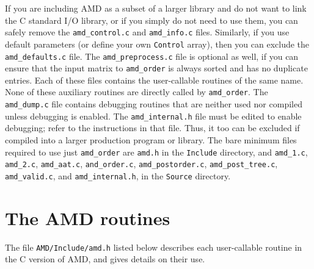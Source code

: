 \documentclass[11pt]{article}
\begin{document}
If you are including AMD as a subset of a larger library and do not want
to link the C standard I/O library, or if you simply do not need to use
them, you can safely remove the {\tt amd\_control.c} and {\tt amd\_info.c}
files.  Similarly, if you use default parameters (or define your
own {\tt Control} array), then you can exclude the {\tt amd\_defaults.c}
file.  The {\tt amd\_preprocess.c} file is optional as well, if you
can ensure that the input matrix to {\tt amd\_order} is always sorted
and has no duplicate entries.
Each of these files contains the user-callable routines of the same
name.  None of these auxiliary routines are directly called by
{\tt amd\_order}.
The {\tt amd\_dump.c} file contains debugging routines
that are neither used nor compiled unless debugging is enabled.
The {\tt amd\_internal.h} file must be edited to enable debugging;
refer to the instructions in that file.  Thus, it too can be excluded
if compiled into a larger production program or library.
The bare minimum files required to use just {\tt amd\_order} are
{\tt amd.h} in the {\tt Include} directory,
and
{\tt amd\_1.c},
{\tt amd\_2.c},
{\tt amd\_aat.c},
{\tt and\_order.c},
{\tt amd\_postorder.c},
{\tt amd\_post\_tree.c},
{\tt amd\_valid.c},
and
{\tt amd\_internal.h},
in the {\tt Source} directory.

\newpage
\section{The AMD routines}
\label{Primary}

The file {\tt AMD/Include/amd.h} listed below
describes each user-callable routine in the C version of AMD,
and gives details on their use.
\end{document}
